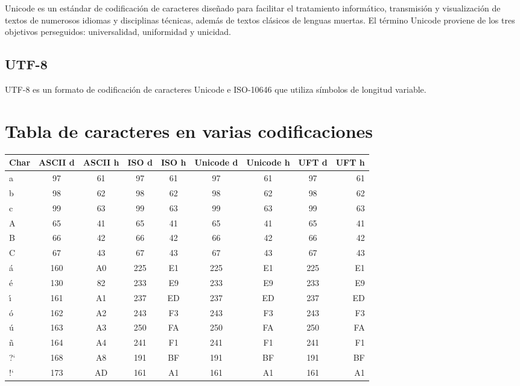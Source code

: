 \documentclass[12pt]{article}
\begin{document}
Unicode es un estándar de codificación de caracteres diseñado para facilitar el tratamiento inform\'atico, transmisi\'on y visualizaci\'on de textos de numerosos idiomas y disciplinas t\'ecnicas, adem\'as de textos cl\'asicos de lenguas muertas. El t\'ermino Unicode proviene de los tres objetivos perseguidos: universalidad, uniformidad y unicidad.

\subsection{UTF-8}

UTF-8 es un formato de codificaci\'on de caracteres Unicode e ISO-10646 que utiliza s\'imbolos de longitud variable.

\section{Tabla de caracteres en varias codificaciones}

\begin{center}
\begin{tabular}{|l|c|c|c|c|c|c|c|r|}

\hline
Char & ASCII d & ASCII h & ISO d & ISO h & Unicode d & Unicode h & UFT d & UFT h \\ \hline
a & 97 & 61 & 97 & 61 & 97 & 61 & 97 & 61 \\ \hline
b & 98 & 62 & 98 & 62 & 98 & 62 & 98 & 62 \\ \hline
c & 99 & 63 & 99 & 63 & 99 & 63 & 99 & 63 \\ \hline
A & 65 & 41 & 65 & 41 & 65 & 41 & 65 & 41 \\ \hline
B & 66 & 42 & 66 & 42 & 66 & 42 & 66 & 42 \\ \hline
C & 67 & 43 & 67 & 43 & 67 & 43 & 67 & 43 \\ \hline
\'a & 160 & A0 & 225 & E1 & 225 & E1 & 225 & E1 \\ \hline
\'e & 130 & 82 & 233 & E9 & 233 & E9 & 233 & E9 \\ \hline
\'{\i} & 161 & A1 & 237 & ED & 237 & ED & 237 & ED \\ \hline
\'o & 162 & A2 & 243 & F3 & 243 & F3 & 243 & F3 \\ \hline
\'u & 163 & A3 & 250 & FA & 250 & FA & 250 & FA \\ \hline
\~n & 164 & A4 & 241 & F1 & 241 & F1 & 241 & F1 \\ \hline
?` & 168 & A8 & 191 & BF & 191 & BF & 191 & BF \\ \hline
!` & 173 & AD & 161 & A1 & 161 & A1 & 161 & A1 \\ \hline

\end{tabular}
\end{center}

\nocite{bm,asciiwiki,asciitab,isowiki,isotab1,isotab2,unicodewiki,unicodetab1,unicodetab2,unicodetab3,utfwiki,utftab1,utftab2}
 
\end{document}
